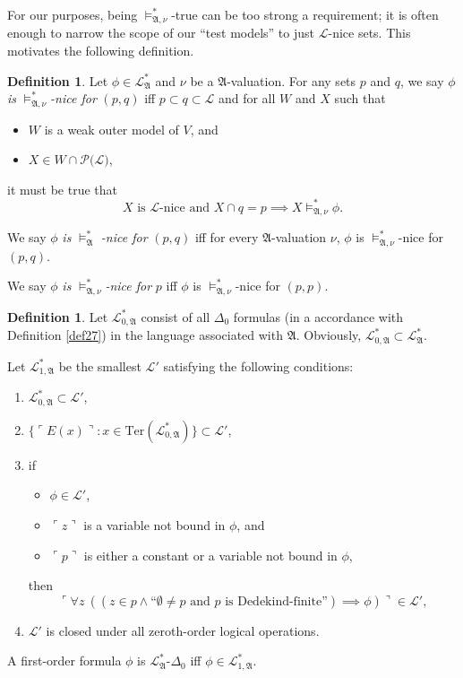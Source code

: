 \documentclass[12pt, twoside]{memoir}
\numberwithin{equation}{section}
\theoremstyle{definition}
\newtheorem{defi}[thm]{Definition}
\theoremstyle{remark}
\theoremstyle{definition}
\theoremstyle{definition}
\theoremstyle{definition}
\theoremstyle{remark}
\begin{document}
For our purposes, being $\models^*_{\mathfrak{A}, \nu}$-true can be too strong a requirement; it is often enough to narrow the scope of our ``test models'' to just $\mathcal{L}$-nice sets. This motivates the following definition.

\begin{defi}
Let $\phi \in \mathcal{L}^{*}_{\mathfrak{A}}$ and $\nu$ be a $\mathfrak{A}$-valuation. For any sets $p$ and $q$, we say $\phi$ \emph{is} $\models^*_{\mathfrak{A}, \nu}$\emph{-nice for} $(p, q)$ iff  $p \subset q \subset \mathcal{L}$ and for all $W$ and $X$ such that
\begin{itemize}
    \item $W$ is a weak outer model of $V$, and
    \item $X \in W \cap \mathcal{P}(\mathcal{L)}$, 
\end{itemize}
it must be true that $$X \text{ is } \mathcal{L} \text{-nice and } X \cap q = p \implies X \models^*_{\mathfrak{A}, \nu} \phi.$$


We say $\phi$ \emph{is} $\models^*_{\mathfrak{A}}$ \emph{-nice for} $(p, q)$ iff for every $\mathfrak{A}$-valuation $\nu$, $\phi$ is $\models^*_{\mathfrak{A}, \nu}$-nice for $(p, q)$.

We say $\phi$ \emph{is} $\models^*_{\mathfrak{A}, \nu}$\emph{-nice for} $p$ iff $\phi$ is $\models^*_{\mathfrak{A}, \nu}$-nice for $(p, p)$.
\end{defi}

\begin{defi}\label{lsub}
Let $\mathcal{L}^{*}_{0, \mathfrak{A}}$ consist of all $\Delta_0$ formulas (in a accordance with Definition \ref{def27}) in the language associated with $\mathfrak{A}$. Obviously, $\mathcal{L}^{*}_{0, \mathfrak{A}} \subset \mathcal{L}^{*}_{\mathfrak{A}}$.

Let $\mathcal{L}^{*}_{1, \mathfrak{A}}$ be the smallest $\mathcal{L}'$ satisfying the following conditions:
\begin{enumerate}[label=(\alph*)]
    \item $\mathcal{L}^{*}_{0, \mathfrak{A}} \subset \mathcal{L}'$,
    \item $\{\ulcorner E(x) \urcorner : x \in \mathrm{Ter}(\mathcal{L}^{*}_{0, \mathfrak{A}})\} \subset \mathcal{L}'$,
    \item if 
    \begin{itemize}[label=$\circ$]
        \item $\phi \in \mathcal{L}'$,
        \item $\ulcorner z \urcorner$ is a variable not bound in $\phi$, and
        \item $\ulcorner p \urcorner$ is either a constant or a variable not bound in $\phi$,
    \end{itemize} 
    then $$\ulcorner \forall z \ ((z \in p \wedge \text{``}\emptyset \neq p \text{ and } p \text{ is Dedekind-finite''}) \implies \phi) \urcorner \in \mathcal{L}',$$
    \item $\mathcal{L}'$ is closed under all zeroth-order logical operations.
\end{enumerate}
A first-order formula $\phi$ is $\mathcal{L}^{*}_{\mathfrak{A}}$-$\Delta_0$ iff $\phi \in \mathcal{L}^{*}_{1, \mathfrak{A}}$. 
\end{defi}
\end{document}
